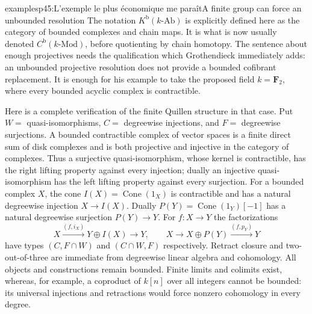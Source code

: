 \begin{dcomment}{examples}{p45:L'exemple le plus économique me paraît}{A finite group can force an unbounded resolution}
The notation $K^{\mathrm b}(k\text{-Ab})$ is explicitly defined here as the category of bounded complexes and chain maps. It is what is now usually denoted $C^{\mathrm b}(k\text{-Mod})$, before quotienting by chain homotopy. The sentence about enough projectives needs the qualification which Grothendieck immediately adds: an unbounded projective resolution does not provide a bounded cofibrant replacement. It is enough for his example to take the proposed field $k=\mathbf F_2$, where every bounded acyclic complex is contractible.

Here is a complete verification of the finite Quillen structure in that case. Put $W=$ quasi-isomorphisms, $C=$ degreewise injections, and $F=$ degreewise surjections. A bounded contractible complex of vector spaces is a finite direct sum of disk complexes and is both projective and injective in the category of complexes. Thus a surjective quasi-isomorphism, whose kernel is contractible, has the right lifting property against every injection; dually an injective quasi-isomorphism has the left lifting property against every surjection. For a bounded complex $X$, the cone $I(X)=\operatorname{Cone}(1_X)$ is contractible and has a natural degreewise injection $X\to I(X)$. Dually $P(Y)=\operatorname{Cone}(1_Y)[-1]$ has a natural degreewise surjection $P(Y)\to Y$. For $f:X\to Y$ the factorizations
\[
 X\xrightarrow{(f,i_X)}Y\oplus I(X)\longrightarrow Y,
 \qquad
 X\longrightarrow X\oplus P(Y)\xrightarrow{(f,p_Y)}Y
\]
have types $(C,F\cap W)$ and $(C\cap W,F)$ respectively. Retract closure and two-out-of-three are immediate from degreewise linear algebra and cohomology. All objects and constructions remain bounded. Finite limits and colimits exist, whereas, for example, a coproduct of $k[n]$ over all integers cannot be bounded: its universal injections and retractions would force nonzero cohomology in every degree.


\end{dcomment}
